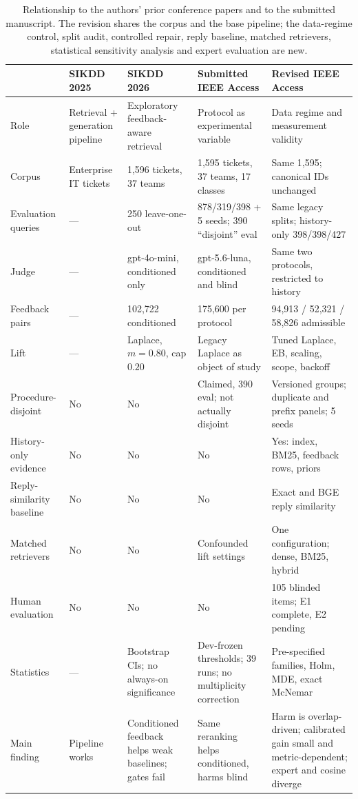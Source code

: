 \begin{table}[t]
\centering
\caption{Relationship to the authors' prior conference papers and to the
submitted manuscript. The revision shares the corpus and the base pipeline;
the data-regime control, split audit, controlled repair, reply baseline, matched
retrievers, statistical sensitivity analysis and expert evaluation are new.}
\label{tab:prior}
\scriptsize
\begin{tabularx}{\textwidth}{@{}p{}XXXX@{}}
\toprule
 & SIKDD 2025 & SIKDD 2026 & Submitted IEEE Access & Revised IEEE Access \\
\midrule
Role & Retrieval + generation pipeline & Exploratory feedback-aware retrieval & Protocol as experimental variable & Data regime and measurement validity \\
Corpus & Enterprise IT tickets & 1,596 tickets, 37 teams & 1,595 tickets, 37 teams, 17 classes & Same 1,595; canonical IDs unchanged \\
Evaluation queries & --- & 250 leave-one-out & 878/319/398 + 5 seeds; 390 ``disjoint'' eval & Same legacy splits; history-only 398/398/427 \\
Judge & --- & gpt-4o-mini, conditioned only & gpt-5.6-luna, conditioned and blind & Same two protocols, restricted to history \\
Feedback pairs & --- & 102,722 conditioned & 175,600 per protocol & 94,913 / 52,321 / 58,826 admissible \\
Lift & --- & Laplace, $m=0.80$, cap $0.20$ & Legacy Laplace as object of study & Tuned Laplace, EB, scaling, scope, backoff \\
Procedure-disjoint & No & No & Claimed, 390 eval; not actually disjoint & Versioned groups; duplicate and prefix panels; 5 seeds \\
History-only evidence & No & No & No & Yes: index, BM25, feedback rows, priors \\
Reply-similarity baseline & No & No & No & Exact and BGE reply similarity \\
Matched retrievers & No & No & Confounded lift settings & One configuration; dense, BM25, hybrid \\
Human evaluation & No & No & No & 105 blinded items; E1 complete, E2 pending \\
Statistics & --- & Bootstrap CIs; no always-on significance & Dev-frozen thresholds; 39 runs; no multiplicity correction & Pre-specified families, Holm, MDE, exact McNemar \\
Main finding & Pipeline works & Conditioned feedback helps weak baselines; gates fail & Same reranking helps conditioned, harms blind & Harm is overlap-driven; calibrated gain small and metric-dependent; expert and cosine diverge \\
\bottomrule
\end{tabularx}
\end{table}

